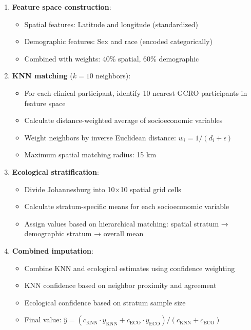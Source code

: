 \begin{enumerate}
    \item \textbf{Feature space construction}:
    \begin{itemize}
        \item Spatial features: Latitude and longitude (standardized)
        \item Demographic features: Sex and race (encoded categorically)
        \item Combined with weights: 40\% spatial, 60\% demographic
    \end{itemize}

    \item \textbf{KNN matching} ($k=10$ neighbors):
    \begin{itemize}
        \item For each clinical participant, identify 10 nearest GCRO participants in feature space
        \item Calculate distance-weighted average of socioeconomic variables
        \item Weight neighbors by inverse Euclidean distance: $w_i = 1/(d_i + \epsilon)$
        \item Maximum spatial matching radius: 15 km
    \end{itemize}

    \item \textbf{Ecological stratification}:
    \begin{itemize}
        \item Divide Johannesburg into 10×10 spatial grid cells
        \item Calculate stratum-specific means for each socioeconomic variable
        \item Assign values based on hierarchical matching: spatial stratum → demographic stratum → overall mean
    \end{itemize}

    \item \textbf{Combined imputation}:
    \begin{itemize}
        \item Combine KNN and ecological estimates using confidence weighting
        \item KNN confidence based on neighbor proximity and agreement
        \item Ecological confidence based on stratum sample size
        \item Final value: $\hat{y} = (c_{\text{KNN}} \cdot y_{\text{KNN}} + c_{\text{ECO}} \cdot y_{\text{ECO}}) / (c_{\text{KNN}} + c_{\text{ECO}})$
    \end{itemize}
\end{enumerate}

